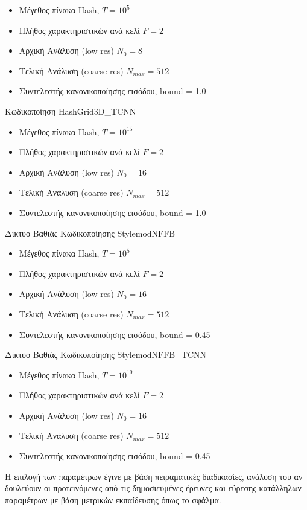 \begin{appendices}
\begin{itemize}
            \item Μέγεθος πίνακα Hash, $T = 10^{5}$
            \item Πλήθος χαρακτηριστικών ανά κελί $F =2$
            \item Αρχική Ανάλυση (low res) $N_0 = 8$
            \item Τελική Ανάλυση (coarse res) $N_{max} = 512$
            \item Συντελεστής κανονικοποίησης εισόδου, bound = 1.0
        \end{itemize}
       Κωδικοποίηση HashGrid3D\_TCNN\\ 
        \begin{itemize}
            \item Μέγεθος πίνακα Hash, $T = 10^{15}$
            \item Πλήθος χαρακτηριστικών ανά κελί $F =2$
            \item Αρχική Ανάλυση (low res) $N_0= 16$
            \item Τελική Ανάλυση (coarse res) $N_{max} = 512$
            \item Συντελεστής κανονικοποίησης εισόδου, bound = 1.0
        \end{itemize}
        Δίκτυο Βαθιάς Κωδικοποίησης StylemodNFFB\\ 
        \begin{itemize}
            \item Μέγεθος πίνακα Hash, $T = 10^{5}$
            \item Πλήθος χαρακτηριστικών ανά κελί $F =2$
            \item Αρχική Ανάλυση (low res) $N_0 = 16$
            \item Τελική Ανάλυση (coarse res) $N_{max} = 512$
            \item Συντελεστής κανονικοποίησης εισόδου, bound = 0.45
        \end{itemize}
         Δίκτυο Βαθιάς Κωδικοποίησης StylemodNFFB\_TCNN\\ 
        \begin{itemize}
            \item Μέγεθος πίνακα Hash, $T = 10^{19}$
            \item Πλήθος χαρακτηριστικών ανά κελί $F =2$
            \item Αρχική Ανάλυση (low res) $ N_0 = 16$
            \item Τελική Ανάλυση (coarse res) $N_{max} = 512$
            \item Συντελεστής κανονικοποίησης εισόδου, bound = 0.45
        \end{itemize}
        Η επιλογή των παραμέτρων έγινε με βάση πειραματικές διαδικασίες, ανάλυση του αν δουλεύουν οι προτεινόμενες από τις δημοσιευμένες έρευνες και εύρεσης κατάλληλων παραμέτρων με βάση μετρικών εκπαίδευσης όπως το σφάλμα.
    

\end{appendices}
